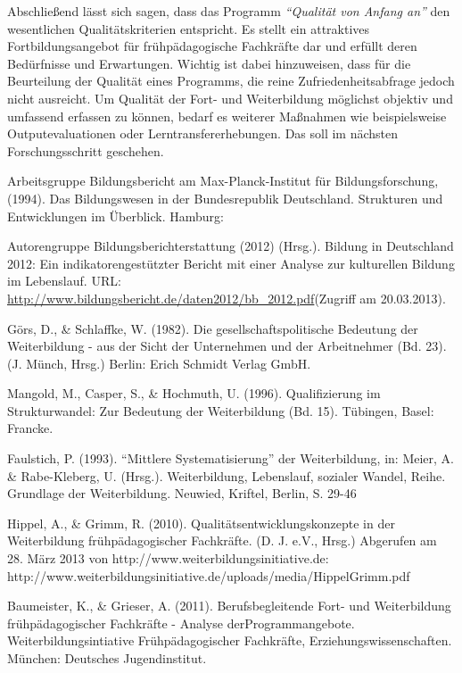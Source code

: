 \documentclass[12pt,a4paper]{article}
\begin{document}
Abschließend lässt sich sagen, dass das Programm \textit{"`Qualität von Anfang an"'} den wesentlichen Qualitätskriterien entspricht. Es stellt ein attraktives Fortbildungsangebot für frühpädagogische Fachkräfte dar und erfüllt deren Bedürfnisse und Erwartungen. 
Wichtig ist dabei hinzuweisen, dass für die Beurteilung der Qualität eines Programms, die reine Zufriedenheitsabfrage jedoch nicht ausreicht. Um Qualität der Fort- und Weiterbildung möglichst objektiv und umfassend erfassen zu können, bedarf es weiterer Maßnahmen wie beispielsweise Outputevaluationen oder Lerntransfererhebungen. Das soll im nächsten Forschungsschritt  geschehen. 



\pagebreak

 


Arbeitsgruppe Bildungsbericht am Max-Planck-Institut für Bildungsforschung, (1994). Das Bildungswesen in der Bundesrepublik Deutschland. Strukturen und Entwicklungen im Überblick. Hamburg: 

Autorengruppe Bildungsberichterstattung (2012) (Hrsg.). Bildung in Deutschland 2012: Ein indikatorengestützter Bericht mit einer Analyse zur kulturellen Bildung im Lebenslauf.
URL: \url{http://www.bildungsbericht.de/daten2012/bb_2012.pdf}(Zugriff am 20.03.2013).

Görs, D., \& Schlaffke, W. (1982). Die gesellschaftspolitische Bedeutung der Weiterbildung - aus der Sicht der Unternehmen und der Arbeitnehmer (Bd. 23). (J. Münch, Hrsg.) Berlin: Erich Schmidt Verlag GmbH.

Mangold, M., Casper, S., \& Hochmuth, U. (1996). Qualifizierung im Strukturwandel: Zur Bedeutung der Weiterbildung (Bd. 15). Tübingen, Basel: Francke.

Faulstich, P. (1993). "`Mittlere Systematisierung"' der Weiterbildung, in: Meier, A. \& Rabe-Kleberg, U. (Hrsg.). Weiterbildung, Lebenslauf, sozialer Wandel, Reihe. Grundlage der Weiterbildung. Neuwied, Kriftel, Berlin, S. 29-46

Hippel, A., \& Grimm, R. (2010). Qualitätsentwicklungskonzepte in der Weiterbildung frühpädagogischer Fachkräfte. (D. J. e.V., Hrsg.) Abgerufen am 28. März 2013 von http://www.weiterbildungsinitiative.de: http://www.weiterbildungsinitiative.de/uploads/media/HippelGrimm.pdf

Baumeister, K., \& Grieser, A. (2011). Berufsbegleitende Fort- und Weiterbildung frühpädagogischer Fachkräfte - Analyse derProgrammangebote. Weiterbildungsintiative Frühpädagogischer Fachkräfte, Erziehungswissenschaften. München: Deutsches Jugendinstitut.
\end{document}
